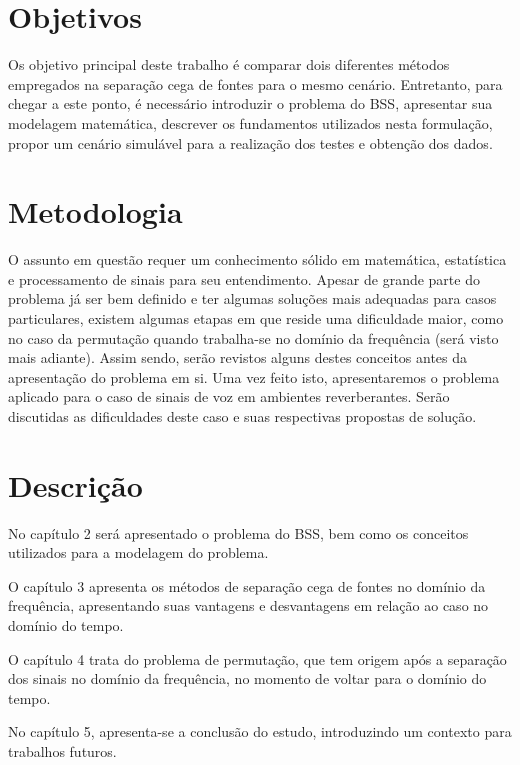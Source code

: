 \section{Objetivos}

Os objetivo principal deste trabalho é comparar dois diferentes métodos empregados na separação cega de fontes para o mesmo cenário. Entretanto, para chegar a este ponto, é necessário introduzir o problema do BSS, apresentar sua modelagem matemática, descrever os fundamentos utilizados nesta formulação, propor um cenário simulável para a realização dos testes e obtenção dos dados.


\section{Metodologia}

O assunto em questão requer um conhecimento sólido em matemática, estatística e processamento de sinais para seu entendimento. Apesar de grande parte do problema já ser bem definido e ter algumas soluções mais adequadas para casos particulares, existem algumas etapas em que reside uma dificuldade maior, como no caso da permutação quando trabalha-se no domínio da frequência (será visto mais adiante). Assim sendo, serão revistos alguns destes conceitos antes da apresentação do problema em si. Uma vez feito isto, apresentaremos o problema aplicado para o caso de sinais de voz em ambientes reverberantes. Serão discutidas as dificuldades deste caso e suas respectivas propostas de solução.


\section{Descrição}

No capítulo 2 será apresentado o problema do BSS, bem como os conceitos utilizados para a modelagem do problema.

O capítulo 3 apresenta os métodos de separação cega de fontes no domínio da frequência, apresentando suas vantagens e desvantagens em relação ao caso no domínio do tempo.

O capítulo 4 trata do problema de permutação, que tem origem após a separação dos sinais no domínio da frequência, no momento de voltar para o domínio do tempo.

No capítulo 5, apresenta-se a conclusão do estudo, introduzindo um contexto para trabalhos futuros.
